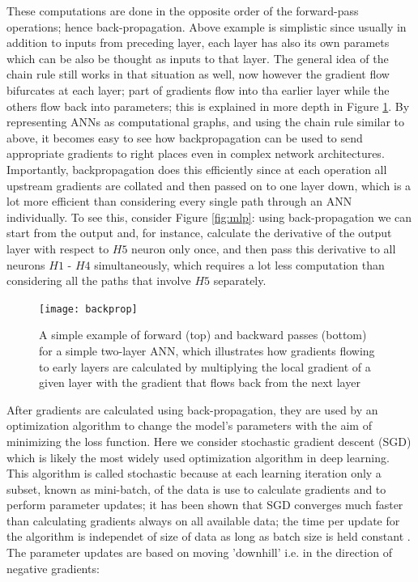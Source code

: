 \documentclass{report}
\begin{document}
These computations are done in the opposite order of the forward-pass operations; hence back-propagation. Above example is simplistic since usually in addition to inputs from preceding layer, each layer has also its own paramets which can be also be thought as inputs to that layer. The general idea of the chain rule still works in that situation as well, now however the gradient flow bifurcates at each layer; part of gradients flow into tha earlier layer while the others flow back into parameters; this is explained in more depth in Figure \ref{fig:backprop}. By representing ANNs as computational graphs, and using the chain rule similar to above, it becomes easy to see how backpropagation can be used to send appropriate gradients to right places even in complex network architectures. Importantly, backpropagation does this efficiently since at each operation all upstream gradients are collated and then passed on to one layer down, which is a lot more efficient than considering every single path through an ANN individually. To see this, consider Figure \ref{fig:mlp}: using back-propagation we can start from the output and, for instance, calculate the derivative of the output layer with respect to $H5$ neuron only once, and then pass this derivative to all neurons $H1$ - $H4$ simultaneously, which requires a lot less computation than considering all the paths that involve $H5$ separately. 

\begin{figure}
  \centering
	\texttt{[image: backprop]}
	\caption{A simple example of forward (top) and backward passes (bottom) for a simple two-layer ANN, which illustrates how gradients flowing to early layers are calculated by multiplying the local gradient of a given layer with the gradient that flows back from the next layer}
	\label{fig:backprop}
\end{figure}

After gradients are calculated using back-propagation, they are used by an optimization algorithm to change the model's parameters with the aim of minimizing the loss function. Here we consider stochastic gradient descent (SGD) \cite{Robbins1951} which is likely the most widely used optimization algorithm in deep learning. This algorithm is called stochastic because at each learning iteration only a subset, known as mini-batch, of the data is use to calculate gradients and to perform parameter updates; it has been shown that SGD converges much faster than calculating gradients always on all available data; the time per update for the algorithm is independet of size of data as long as batch size is held constant \cite{Goodfellow2016}. The parameter updates are based on moving 'downhill' i.e. in the direction of negative gradients:
\end{document}
